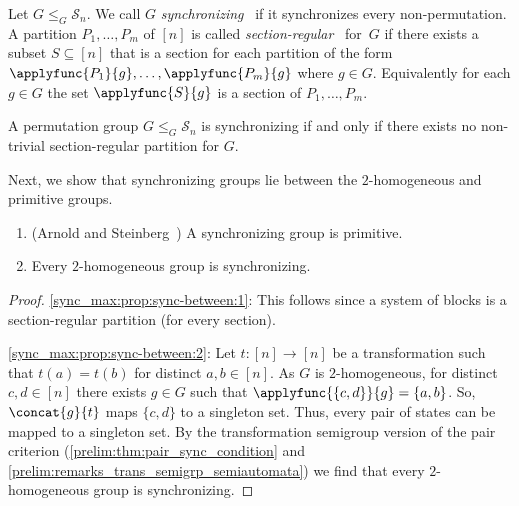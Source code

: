 

Let $G \le_G \mathcal S_n$.
We call $G$ \emph{synchronizing}~\cite{ArnoldS06} 
if it synchronizes every non-permutation. 
A partition $P_1, \ldots, P_m$ of $[n]$ is called
\emph{section-regular}~\cite{Neumann09} 
for~$G$ if there exists a subset $S\subseteq [n]$
that is a section for each partition of the form
 $\applyfunc{P_1}{g}, \ldots, \applyfunc{P_m}{g}$
where $g \in G$. Equivalently
for each $g \in G$ the set $\applyfunc{S}{g}$ 
is a section of $P_1, \ldots, P_m$.

\begin{theorem}
\label{sync_max:thm:sync_equals_no_sect_regular}
	A permutation group $G \le_G \mathcal S_n$ is synchronizing
	if and only if there exists no non-trivial section-regular
	partition for $G$. 
\end{theorem}

Next, we show that synchronizing groups lie between the $2$-homogeneous and primitive groups.

\begin{proposition}
\label{sync_max:prop:sync-between}
\begin{enumerate}
\item \label{sync_max:prop:sync-between:1} (Arnold and Steinberg~\cite{ArnoldS06}) A synchronizing group is primitive.

\item \label{sync_max:prop:sync-between:2} Every $2$-homogeneous group 
is synchronizing.

\end{enumerate}
\end{proposition}
\begin{proof}
\ref{sync_max:prop:sync-between:1}:	This follows since a system of blocks is a section-regular partition
(for every section).

\ref{sync_max:prop:sync-between:2}:  Let $t \colon [n] \to [n]$
 be a transformation such that $t(a) = t(b)$ for distinct $a,b \in [n]$.
 As $G$ is $2$-homogeneous, for distinct $c,d \in [n]$
 there exists $g \in G$
 such that $\applyfunc{\{c,d\}}{g} = \{a,b\}$.
 So,  $\concat{g}{t}$ maps $\{c,d\}$ to a singleton set.
 Thus, every pair of states can be mapped to a singleton set.
 By the transformation semigroup version
 of the pair criterion (\cref{prelim:thm:pair_sync_condition} and \cref{prelim:remarks_trans_semigrp_semiautomata})
 we find that every $2$-homogeneous group 
 is synchronizing.
\end{proof}


